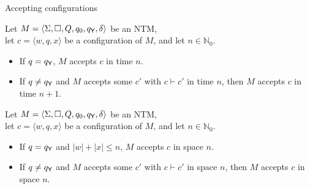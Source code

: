 \documentclass{gkibeamer}
\begin{document}
\begin{frame}{Accepting configurations}
  \begin{definition}
    Let $M = \langle \Sigma, \Box, Q, q_0, q_{\textsf{Y}}, \delta\rangle$
    be an NTM, \\
    let $c = \langle w, q, x\rangle$ be a configuration of $M$,
    and let $n \in \mathbb N_0$.
    \begin{itemize}
    \item If $q = q_{\textsf{Y}}$, $M$ \alert{accepts $c$ in time $n$}.
    \item If $q \neq q_{\textsf{Y}}$ and $M$ accepts some $c'$ with $c
      \vdash c'$ in time $n$, then $M$ \alert{accepts $c$ in time $n +
        1$}.
    \end{itemize}
  \end{definition}
  \begin{definition}
    Let $M = \langle \Sigma, \Box, Q, q_0, q_{\textsf{Y}}, \delta\rangle$
    be an NTM, \\
    let $c = \langle w, q, x\rangle$ be a configuration of $M$,
    and let $n \in \mathbb N_0$.
    \begin{itemize}
    \item If $q = q_{\textsf{Y}}$ and $|w| + |x| \le n$, $M$ \alert{accepts
      $c$ in space $n$}. 
    \item If $q \neq q_{\textsf{Y}}$ and $M$ accepts some $c'$ with $c
      \vdash c'$ in space $n$, then $M$ \alert{accepts $c$ in space
        $n$}.
    \end{itemize}
  \end{definition}
\end{frame}
\end{document}
